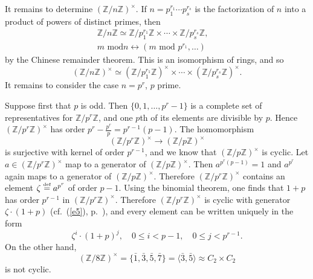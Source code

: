 \documentclass[a4paper,11pt,final]{memoir}%
\theoremstyle{nonumberplain}
\begin{document}
It remains to determine $(\mathbb{Z}/n\mathbb{Z})^{\times}$. If $n=p_{1}%
^{r_{1}}\cdots p_{s}^{r_{s}}$ is the factorization of $n$ into a product of
powers of distinct primes, then%
\begin{align*}
\mathbb{Z}/n\mathbb{Z}\simeq\mathbb{Z}/p_{1}^{r_{1}}\mathbb{Z}\times
\cdots\times\mathbb{Z}/p_{s}^{r_{s}}\mathbb{Z},\quad\\
 m\text{ mod
}n\leftrightarrow(m\text{ mod }p^{r_{1}},\ldots)
\end{align*}
by the Chinese remainder theorem. This is an isomorphism of rings, and so%
\[
(\mathbb{Z}/n\mathbb{Z})^{\times}\simeq(\mathbb{Z}/p_{1}^{r_{1}}%
\mathbb{Z})^{\times}\times\cdots\times(\mathbb{Z}/p_{s}^{r_{s}}\mathbb{Z}%
)^{\times}.
\]
It remains to consider the case $n=p^{r}$, $p$ prime.

Suppose first that $p$ is odd. Then $\{0,1,\ldots,p^{r}-1\}$ is a complete set
of representatives for $\mathbb{Z}/p^{r}\mathbb{Z}$, and one $p$th of its
elements are divisible by $p$. Hence $(\mathbb{Z}/p^{r}\mathbb{Z})^{\times}$
has order $p^{r}-\frac{p^{r}}{p}=p^{r-1}(p-1)$. The homomorphism%
\[
(\mathbb{Z}/p^{r}\mathbb{Z})^{\times}\rightarrow(\mathbb{Z}/p\mathbb{Z}%
)^{\times}%
\]
is surjective with kernel of order $p^{r-1}$, and we know that $(\mathbb{Z}%
/p\mathbb{Z})^{\times}$ is cyclic. Let $a\in(\mathbb{Z}/p^{r}\mathbb{Z}%
)^{\times}$ map to a generator of $(\mathbb{Z}{}/p\mathbb{Z}{})^{\times}$.
Then $a^{p^{r}(p-1)}=1$ and $a^{p^{r}}$ again maps to a generator of
$(\mathbb{Z}{}/p\mathbb{Z}{})^{\times}$. Therefore $(\mathbb{Z}{}%
/p^{r}\mathbb{Z}{})^{\times}$ contains an element $\zeta
\overset{\textup{{\tiny def}}}{=}a^{p^{r}}$ of order $p-1$. Using the binomial
theorem, one finds that $1+p$ has order $p^{r-1}$ in $(\mathbb{Z}%
/p^{r}\mathbb{Z})^{\times}$. Therefore $(\mathbb{Z}/p^{r}\mathbb{Z})^{\times}$
is cyclic with generator $\zeta\cdot(1+p)$ (cf.\ (\ref{e5}), p.~\pageref{e5}),
and every element can be written uniquely in the form
\[
\zeta^{i}\cdot(1+p)^{j},\quad0\leq i<p-1,\quad0\leq j<p^{r-1}.
\]
On the other hand,
\[
(\mathbb{Z}/8\mathbb{Z})^{\times}=\{\bar{1},\bar{3},\bar{5},\bar{7}%
\}=\langle\bar{3},\bar{5}\rangle\approx C_{2}\times C_{2}%
\]
is not cyclic.
\end{document}

